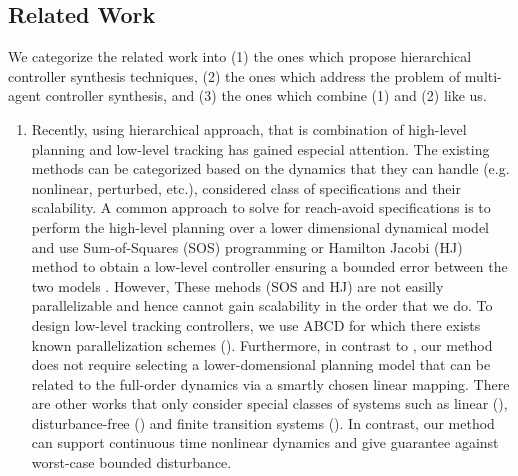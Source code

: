 \subsection{Related Work}

We categorize the related work into (1) the ones which propose hierarchical controller synthesis techniques, (2) the ones which address the problem of multi-agent controller synthesis, and (3) the ones which combine (1) and (2) like us.

\begin{enumerate}[(1)]
	\item Recently, using hierarchical approach, that is combination of high-level planning and low-level tracking has gained especial attention. The existing methods can be categorized based on the dynamics that they can handle (e.g. nonlinear, perturbed, etc.), considered class of specifications and their scalability. A common approach to solve for reach-avoid specifications is to perform the high-level planning over a lower dimensional dynamical model and use
	Sum-of-Squares (SOS) programming or Hamilton Jacobi (HJ) method to obtain a low-level controller ensuring a bounded error between the two models \cite{herbert2017fastrack,DBLP:journals/corr/abs-1911-09773,singh2018robust}. However, These mehods (SOS and HJ) are not easilly parallelizable and hence cannot gain scalability in the order that we do. To design low-level tracking controllers, we use ABCD for which there exists known parallelization schemes (\cite{KhaledZ19pfaces}). Furthermore, in contrast to \cite{herbert2017fastrack,singh2018robust}, our method does not require selecting a lower-domensional planning model that can be related to the full-order dynamics via a smartly chosen linear mapping. There are other works that only consider special classes of systems such as linear (\cite{fan2018controller,wongpiromsarn2012receding}), disturbance-free (\cite{tedrake2010lqr,fan2020fast}) and finite transition systems (\cite{Yang2017milp}). In contrast, our method can support continuous time nonlinear dynamics and give guarantee against worst-case bounded disturbance.
	

\end{enumerate}
